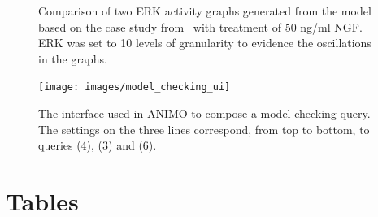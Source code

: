 \documentclass{bmcart}
\begin{document}
\begin{backmatter}
\begin{figure}[!htb]
\begin{center}
\end{center}
  \caption{Comparison of two ERK activity graphs generated from the model based on the case study from~\cite{animo-bibe} with treatment of 50 ng/ml NGF.
  ERK was set to 10 levels of granularity to evidence the oscillations in the graphs.
  \label{fig:comparison-graph-animo}}
\end{figure}

\begin{figure}[htb]
  \begin{center}
    \texttt{[image: images/model\_checking\_ui]}
  \end{center}
  \caption{The interface used in ANIMO to compose a model checking query.
  The settings on the three lines correspond, from top to bottom,
  to queries (4), (3) and (6).\label{fig:model-checking-ui}}
\end{figure}




\section*{Tables}




\end{backmatter}
\end{document}
